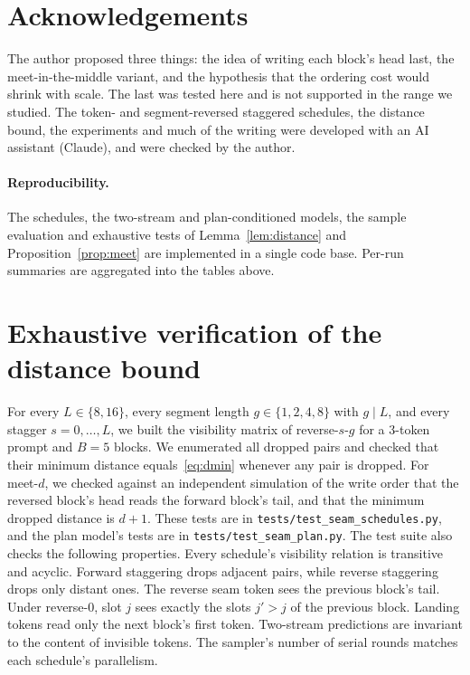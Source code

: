 \documentclass[11pt]{article}
\theoremstyle{definition}
\theoremstyle{remark}
\newcommand{\sch}[1]{\textsf{#1}}
\begin{document}
\section*{Acknowledgements}
The author proposed three things: the idea of writing each block's head last, the meet-in-the-middle variant, and the hypothesis that the ordering cost would shrink with scale. The last was tested here and is not supported in the range we studied.
The token- and segment-reversed staggered schedules, the distance bound, the experiments and much of the writing were developed with an AI assistant (Claude), and were checked by the author.

\paragraph{Reproducibility.}
The schedules, the two-stream and plan-conditioned models, the sample evaluation and exhaustive tests of Lemma~\ref{lem:distance} and Proposition~\ref{prop:meet} are implemented in a single code base.
Per-run summaries are aggregated into the tables above.




\appendix

\section{Exhaustive verification of the distance bound}
\label{app:verification}

For every $L\in\{8,16\}$, every segment length $g\in\{1,2,4,8\}$ with $g\mid L$, and every stagger $s=0,\dots,L$, we built the visibility matrix of \sch{reverse-$s$-$g$} for a 3-token prompt and $B=5$ blocks.
We enumerated all dropped pairs and checked that their minimum distance equals~\eqref{eq:dmin} whenever any pair is dropped.
For \sch{meet-$d$}, we checked against an independent simulation of the write order that the reversed block's head reads the forward block's tail, and that the minimum dropped distance is $d+1$.
These tests are in \texttt{tests/test\_seam\_schedules.py}, and the plan model's tests are in \texttt{tests/test\_seam\_plan.py}.
The test suite also checks the following properties.
Every schedule's visibility relation is transitive and acyclic.
Forward staggering drops adjacent pairs, while reverse staggering drops only distant ones.
The reverse seam token sees the previous block's tail.
Under \sch{reverse-0}, slot $j$ sees exactly the slots $j'>j$ of the previous block.
Landing tokens read only the next block's first token.
Two-stream predictions are invariant to the content of invisible tokens.
The sampler's number of serial rounds matches each schedule's parallelism.
\end{document}
